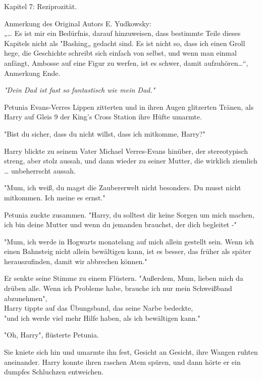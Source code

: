 

\hypertarget{reziprozituxe4t}{%

Kapitel 7: Reziprozität.

Anmerkung des Original Autors E. Yudkowsky:\\ „… Es ist mir ein Bedürfnis, darauf hinzuweisen, dass bestimmte Teile dieses Kapitels nicht als "Bashing„ gedacht sind. Es ist nicht so, dass ich einen Groll hege, die Geschichte schreibt sich einfach von selbst, und wenn man einmal anfängt, Ambosse auf eine Figur zu werfen, ist es schwer, damit aufzuhören…“, Anmerkung Ende.

\emph{"Dein Dad ist fast so fantastisch wie mein Dad."}

Petunia Evans-Verres Lippen zitterten und in ihren Augen glitzerten Tränen, als Harry auf Gleis 9 der King's Cross Station ihre Hüfte umarmte.

"Bist du sicher, dass du nicht willst, dass ich mitkomme, Harry?"

Harry blickte zu seinem Vater Michael Verres-Evans hinüber, der stereotypisch streng, aber stolz aussah, und dann wieder zu seiner Mutter, die wirklich ziemlich … unbeherrscht aussah.

"Mum, ich weiß, du magst die Zaubererwelt nicht besonders. Du musst nicht mitkommen. Ich meine es ernst."

Petunia zuckte zusammen. "Harry, du solltest dir keine Sorgen um mich machen, ich bin deine Mutter und wenn du jemanden brauchst, der dich begleitet -"

"Mum, ich werde in Hogwarts monatelang auf mich allein gestellt sein. Wenn ich einen Bahnsteig nicht allein bewältigen kann, ist es besser, das früher als später herauszufinden, damit wir abbrechen können."

Er senkte seine Stimme zu einem Flüstern. "Außerdem, Mum, lieben mich da drüben alle. Wenn ich Probleme habe, brauche ich nur mein Schweißband abzunehmen",\\ Harry tippte auf das Übungsband, das seine Narbe bedeckte,\\ "und ich werde viel mehr Hilfe haben, als ich bewältigen kann."

"Oh, Harry", flüsterte Petunia.

Sie kniete sich hin und umarmte ihn fest, Gesicht an Gesicht, ihre Wangen ruhten aneinander. Harry konnte ihren raschen Atem spüren, und dann hörte er ein dumpfes Schluchzen entweichen.

}
